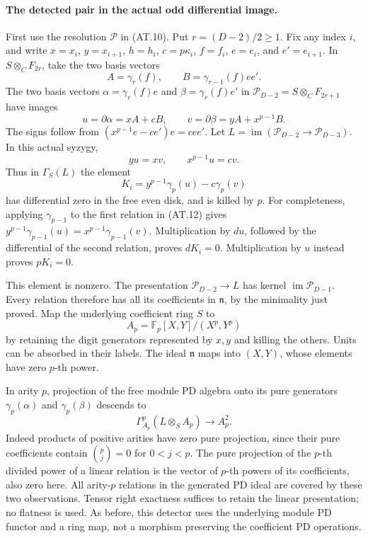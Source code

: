 \paragraph{The detected pair in the actual odd differential image.}
First use the resolution \(\mathcal P\) in (AT.10).
Put \(r=(D-2)/2\geq1\). Fix any index \(i\), and write
\(x=x_i\), \(y=x_{i+1}\), \(h=h_i\),
\(c=p\kappa_i\), \(f=f_i\), \(e=e_i\), and
\(e'=e_{i+1}\). In \(S\otimes_C F_{2r}\), take the
two basis vectors
\[
               A=\gamma_r(f),\qquad
               B=\gamma_{r-1}(f)e e'.
\]
The two basis vectors
\(\alpha=\gamma_r(f)e\) and
\(\beta=\gamma_r(f)e'\) in
\(\mathcal P_{D-2}=S\otimes_C F_{2r+1}\) have images
\[
 u=\partial\alpha=xA+cB,
 \qquad v=\partial\beta=yA+x^{p-1}B.                    \tag{AT.11}
\]
The signs follow from
\((x^{p-1}e-c e')e=c e e'\).
Let \(L=\operatorname{im}(\mathcal P_{D-2}\to
\mathcal P_{D-3})\). In this actual syzygy,
\[
                      yu=xv,\qquad x^{p-1}u=cv.          \tag{AT.12}
\]
Thus in \(\Gamma_S(L)\) the element
\[
              K_i=y^{p-1}\gamma_p(u)-c\gamma_p(v)        \tag{AT.13}
\]
has differential zero in the free even disk, and is killed
by \(p\). For completeness, applying \(\gamma_{p-1}\)
to the first relation in (AT.12) gives
\(y^{p-1}\gamma_{p-1}(u)=
  x^{p-1}\gamma_{p-1}(v)\).
Multiplication by \(du\), followed by the differential of
the second relation, proves \(dK_i=0\). Multiplication by
\(u\) instead proves \(pK_i=0\).

This element is nonzero. The presentation
\(\mathcal P_{D-2}\to L\) has kernel
\(\operatorname{im}\mathcal P_{D-1}\). Every relation
therefore has all its coefficients in \(\mathfrak n\), by
the minimality just proved. Map the underlying coefficient ring
\(S\) to
\[
              A_p=\mathbb F_p[X,Y]/(X^p,Y^p)
\]
by retaining the digit generators represented by \(x,y\)
and killing the others. Units can be absorbed in their labels.
The ideal \(\mathfrak n\) maps into \((X,Y)\), whose
elements have zero \(p\)-th power.

In arity \(p\), projection of the free module PD algebra
onto its pure generators \(\gamma_p(\alpha)\) and
\(\gamma_p(\beta)\) descends to
\[
            \Gamma_{A_p}^p(L\otimes_S A_p)
                                      \longrightarrow A_p^2.
                                                               \tag{AT.14}
\]
Indeed products of positive arities have zero pure projection,
since their pure coefficients contain \(\binom pj=0\)
for \(0<j<p\). The pure projection of the \(p\)-th
divided power of a linear relation is the vector of \(p\)-th
powers of its coefficients, also zero here. All arity-\(p\)
relations in the generated PD ideal are covered by these two
observations. Tensor right exactness suffices to retain the
linear presentation; no flatness is used. As before, this
detector uses the underlying module PD functor and a ring map,
not a morphism preserving the coefficient PD operations.

